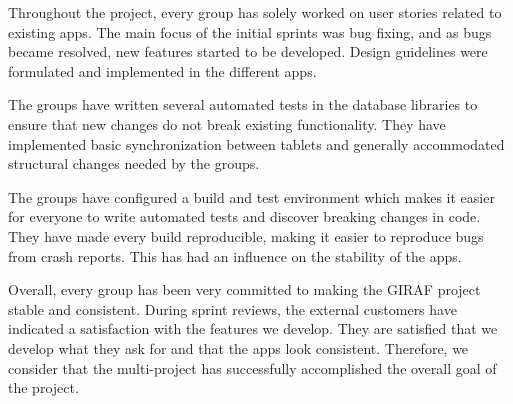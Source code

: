 Throughout the project, every \gui{} group has solely worked on user stories related to existing apps. The main focus of the initial sprints was bug fixing, and as bugs became resolved, new features started to be developed. Design guidelines were formulated and implemented in the different apps.

The \db{} groups have written several automated tests in the database libraries to ensure that new changes do not break existing functionality. They have implemented basic synchronization between tablets and generally accommodated structural changes needed by the \gui{} groups.

The \bd{} groups have configured a build and test environment which makes it easier for everyone to write automated tests and discover breaking changes in code. They have made every build reproducible, making it easier to reproduce bugs from crash reports. This has had an influence on the stability of the apps.

Overall, every group has been very committed to making the GIRAF project stable and consistent. During sprint reviews, the external customers have indicated a satisfaction with the features we develop. They are satisfied that we develop what they ask for and that the apps look consistent. Therefore, we consider that the multi-project has successfully accomplished the overall goal of the project.
